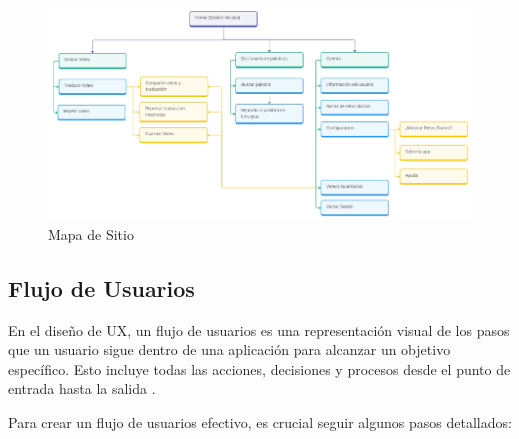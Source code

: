 \begin{figure} [H]
    \centering
    \includegraphics[width=1\linewidth]{figuras/mapa_sitio.png}
    \caption{Mapa de Sitio}
    \label{fig:enter-label}
\end{figure}


\subsection{Flujo de Usuarios}

En el diseño de UX, un flujo de usuarios es una representación visual de los pasos que un usuario sigue dentro de una aplicación para alcanzar un objetivo específico. Esto incluye todas las acciones, decisiones y procesos desde el punto de entrada hasta la salida \cite{Adobe2022}.

Para crear un flujo de usuarios efectivo, es crucial seguir algunos pasos detallados:

